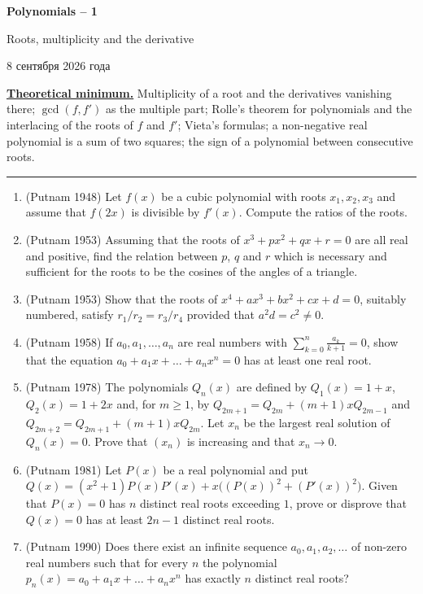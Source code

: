 \documentclass[11pt,a4paper]{article}
\renewcommand{\ge}{\geqslant}
\newcommand{\head}[1]{\par\medskip\noindent\textbf{\underline{#1}}\quad}
\newcommand{\sheettitle}[4]{%
  \begin{center}
  {\huge\bfseries #1\par}\vspace{1.2em}
  {\Large #2\par}\vspace{0.8em}
  \if\relax\detokenize{#3}\relax\else{\Large #3\par}\vspace{0.8em}\fi
  {\foreignlanguage{russian}{#4}\par}
  \end{center}\vspace{0.5em}}
\begin{document}
\sheettitle{Polynomials -- 1}{Roots, multiplicity and the derivative}{Homework}{8 сентября 2026 года}

\head{Theoretical minimum.} Multiplicity of a root and the derivatives vanishing there;
$\gcd(f,f')$ as the multiple part; Rolle's theorem for polynomials and the interlacing of the
roots of $f$ and $f'$; Vieta's formulas; a non-negative real polynomial is a sum of two squares;
the sign of a polynomial between consecutive roots.

\medskip\noindent\rule{\linewidth}{0.4pt}

\begin{enumerate}[leftmargin=2.2em,itemsep=0.6em]
\item (Putnam 1948) Let $f(x)$ be a cubic polynomial with roots $x_1,x_2,x_3$ and assume that
$f(2x)$ is divisible by $f'(x)$. Compute the ratios of the roots.

\item (Putnam 1953) Assuming that the roots of $x^3+px^2+qx+r=0$ are all real and positive, find
the relation between $p$, $q$ and $r$ which is necessary and sufficient for the roots to be the
cosines of the angles of a triangle.

\item (Putnam 1953) Show that the roots of $x^4+ax^3+bx^2+cx+d=0$, suitably numbered, satisfy
$r_1/r_2=r_3/r_4$ provided that $a^2d=c^2\ne0$.

\item (Putnam 1958) If $a_0,a_1,\dots,a_n$ are real numbers with
$\sum_{k=0}^n\frac{a_k}{k+1}=0$, show that the equation $a_0+a_1x+\dots+a_nx^n=0$ has at least
one real root.

\item (Putnam 1978) The polynomials $Q_n(x)$ are defined by $Q_1(x)=1+x$, $Q_2(x)=1+2x$ and, for
$m\ge1$, by $Q_{2m+1}=Q_{2m}+(m+1)xQ_{2m-1}$ and $Q_{2m+2}=Q_{2m+1}+(m+1)xQ_{2m}$. Let $x_n$ be
the largest real solution of $Q_n(x)=0$. Prove that $(x_n)$ is increasing and that $x_n\to0$.

\item (Putnam 1981) Let $P(x)$ be a real polynomial and put
$Q(x)=(x^2+1)P(x)P'(x)+x\bigl((P(x))^2+(P'(x))^2\bigr)$. Given that $P(x)=0$ has $n$ distinct
real roots exceeding $1$, prove or disprove that $Q(x)=0$ has at least $2n-1$ distinct real
roots.

\item (Putnam 1990) Does there exist an infinite sequence $a_0,a_1,a_2,\dots$ of non-zero real
numbers such that for every $n$ the polynomial $p_n(x)=a_0+a_1x+\dots+a_nx^n$ has exactly $n$
distinct real roots?


\end{enumerate}
\end{document}
